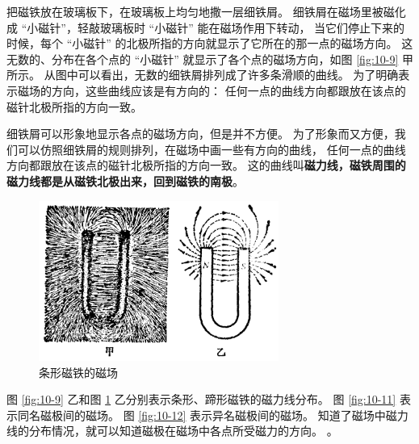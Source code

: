 把磁铁放在玻璃板下，在玻璃板上均匀地撒一层细铁屑。
细铁屑在磁场里被磁化成 “小磁针”，轻敲玻璃板时 “小磁针” 能在磁场作用下转动，
当它们停止下来的时候，每个 “小磁针” 的北极所指的方向就显示了它所在的那一点的磁场方向。
这无数的、分布在各个点的 “小磁针” 就显示了各个点的磁场方向，如图 \ref{fig:10-9} 甲所示。
从图中可以看出，无数的细铁屑排列成了许多条滑顺的曲线。
为了明确表示磁场的方向，这些曲线应该是有方向的：
任何一点的曲线方向都跟放在该点的磁针北极所指的方向一致。

细铁屑可以形象地显示各点的磁场方向，但是并不方便。
为了形象而又方便，我们可以仿照细铁屑的规则排列，在磁场中画一些有方向的曲线，
任何一点的曲线方向都跟放在该点的磁针北极所指的方向一致。
这的曲线叫\textbf{磁力线，磁铁周围的磁力线都是从磁铁北极出来，回到磁铁的南极}。

\begin{figure}[htbp]
    \centering
    \includegraphics[width=0.7\textwidth]{../pic/czwl2-ch10-10}
    \caption{条形磁铁的磁场}\label{fig:10-10}
\end{figure}

图 \ref{fig:10-9} 乙和图 \ref{fig:10-10} 乙分别表示条形、蹄形磁铁的磁力线分布。
图 \ref{fig:10-11} 表示同名磁极间的磁场。
图 \ref{fig:10-12} 表示异名磁极间的磁场。
知道了磁场中磁力线的分布情况，就可以知道磁极在磁场中各点所受磁力的方向。
。


